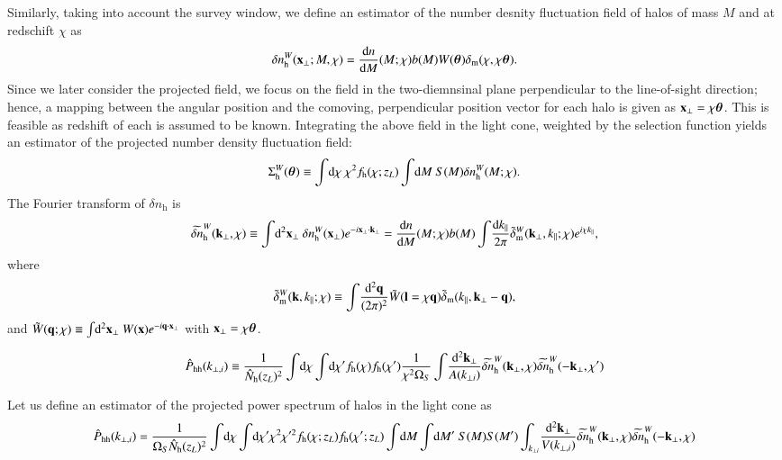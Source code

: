 \documentclass[onecolumn,notitlepage,showpacs,amsmath,amssymb,prd,floatfix]{revtex4-1}
\newcommand{\bx}{{\bf x}}
\newcommand{\bk}{{\bf k}}
\newcommand{\btheta}{{\bm{\theta}}}
\newcommand{\bq}{{\bf q}}
\newcommand{\bl}{{\bf l}}
\newcommand{\tW}{\tilde{W}}
\newcommand{\dr}{\mathrm{d}}
\newcommand{\deltam}{\delta_{\mathrm{m}}}
\newcommand{\tdeltam}{\tilde{\delta}_{\mathrm{m}}}
\newcommand{\hphh}{\hat{P}_{\mathrm{hh}}}
\newcommand{\bh}{\mathrm{h}}
\newcommand{\bnh}{\frac{\dr n}{\dr M}}
\newcommand{\sigmah}{\Sigma_{\rm h}}
\newcommand{\dnh}{\delta n_{\mathrm{h}}}
\newcommand{\tdnh}{\widetilde{\delta n}_{\mathrm{h}}}
\begin{document}
Similarly, taking into account the survey window, we define an estimator
of the number desnity fluctuation field of halos of mass $M$ and at
redschift $\chi$ as
%
\begin{equation}
\dnh^W(\bx_\perp; M,
 \chi)=\bnh(M;\chi)b(M)W(\btheta)\deltam(\chi,\chi\btheta).
 \label{eq:dnh}
\end{equation}
%
Since we later consider the projected field, we focus on the field in
the two-diemnsinal plane perpendicular to the line-of-sight direction;
hence, a mapping between the angular position and the comoving,
perpendicular position vector for each halo is given as
$\bx_\perp=\chi\btheta$. This is feasible as redshift of each is assumed
to be known. Integrating the above field in the light cone, weighted by
the selection function yields an estimator of the projected number
density fluctuation field:
%
\begin{equation}
 \sigmah^W(\btheta)\equiv \int\!\dr\chi~\chi^2 f_\bh(\chi;z_L)\int\!\dr M~
  S(M)\dnh^W(M;\chi).
  \end{equation}
 The Fourier transform of $\dnh$ is
\begin{equation}
 \tdnh^W(\bk_\perp,\chi)\equiv \int\!\dr^2\bx_\perp~\dnh^W(\bx_\perp)e^{-i\bx_\perp\cdot\bk_\perp}
  =\bnh(M;\chi)
  b(M)\int\!\frac{\dr k_\parallel}{2\pi}\tdeltam^W(\bk_\perp,k_\parallel;\chi)
  e^{i\chi k_\parallel},
\end{equation}
%
where
%
\begin{equation}
 \tdeltam^W(\bk,k_\parallel;\chi)\equiv 
  \int\!\frac{\dr^2\bq}{(2\pi)^2}\tW(\bl=\chi\bq)
  \tdeltam(k_\parallel,\bk_\perp-\bq),
\end{equation}
%
and $\tW(\bq;\chi)\equiv
\int\!\dr^2\bx_\perp~W(\bx)e^{-i\bq\cdot\bx_\perp}$ with $\bx_\perp=\chi\btheta$.



\begin{equation}
\hphh(k_{\perp,i})\equiv
 \frac{1}{\hat{N}_\bh(z_L)^2}\int\!\dr\chi\int\!\dr\chi'
f_\bh(\chi)f_\bh(\chi')\frac{1}{\chi^2\Omega_S}\int\!\frac{\dr^2\bk_{\perp}}{A(k_{\perp
i})} \tdnh^W(\bk_\perp,\chi)\tdnh^W(-\bk_\perp,\chi')
\end{equation}


Let us define an estimator of the projected power spectrum of halos in
the light cone as
%
\begin{equation}
 \hphh(k_{\perp, i})=\frac{1}{\Omega_S\hat{N}_\bh(z_L)^2}
  \int\!\dr\chi\int\!\dr\chi' \chi^2\chi^{\prime 2}f_\bh(\chi;z_L)f_\bh(\chi';z_L)
  \int\!\dr M\int\!\dr M'~S(M)S(M')\int_{k_{\perp
  i}}\!\frac{\dr^2\bk_\perp}{V(k_{\perp, i})} \tdnh^W(\bk_\perp,\chi) \tdnh^W(-\bk_\perp,\chi)
\end{equation}
%
\end{document}
